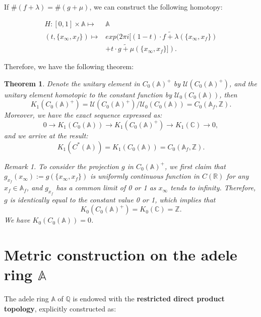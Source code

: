 \documentclass[11pt]{article}
\newtheorem{theorem}{Theorem}[section]  %
\newcommand{\CA}{C_0(\mathbb{A})}
\newcommand{\A}{\mathbb{A}}
\theoremstyle{remark}
\newtheorem{remark}{Remark}[section] %
\begin{document}
If $\#(f+\lambda)=\#(g+\mu)$, we can construct the following homotopy:

\begin{align*}
    H:[0,1]\times\A\mapsto&\A\\
         (t,\{x_\infty,x_f\})\mapsto& exp(2\pi i[(1-t)\cdot\widetilde{f+\lambda}(\{x_\infty,x_f\})\\
         &+t\cdot\widetilde{g+\mu}(\{x_\infty,x_f\}]).
\end{align*}

Therefore, we have the following theorem:
\begin{theorem}\label{K1A}
    Denote the unitary element in \(C_0(\A)^+\) by \(\mathcal{U}(C_0(\A)^+)\), and the unitary element homotopic to the constant function by \(\mathcal{U}_0(\CA)\), then \[K_1(C_0(\A)^+)=
    \mathcal{U}(C_0(\A)^+)/\mathcal{U}_0(\CA)=C_0(\A_f,\mathbb{Z}).
    \]
Moreover, we have the exact sequence expressed as:
\[ 0\rightarrow K_1(C_0(\A))\rightarrow K_1(\CA^+)\rightarrow K_1(\mathbb{C})\rightarrow 0, \] and
we arrive at the result:
\[
K_1(C^*(\A))=K_1(\CA)=C_0(\A_f,\mathbb{Z}).
\]
\begin{remark}\label{K0A}
To consider the projection $g$ in $\CA^+$, we first claim that $g_{x_f}(x_\infty):=g(\{x_\infty,x_f\})$ is uniformly  continuous function in $C(\mathbb{R})$ for any $x_f\in \A_f$, and $g_{x_f}$ has a common limit of 0 or 1 as $x_\infty$ tends to infinity. Therefore, $ g $ is identically equal to the constant value 0 or 1, which implies that
\[
K_0(\CA^+)=K_0(\mathbb{C})=\mathbb{Z}.
\]
We have $K_0(C_0(\A))=0$.    
\end{remark}
\end{theorem}
\newpage
\appendix
\section{Metric construction on the adele ring \texorpdfstring{$\A$}{A}}\label{metric}

The adele ring $\mathbb{A}$ of $\mathbb{Q}$ is endowed with the \textbf{restricted direct product topology}, explicitly constructed as:
\end{document}
